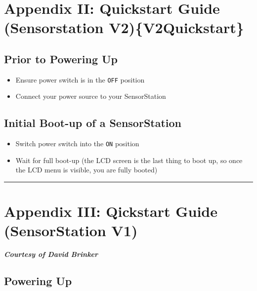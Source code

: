 \documentclass[
]{article}
\providecommand{\tightlist}{%
  \setlength{\itemsep}{0pt}\setlength{\parskip}{0pt}}
\begin{document}
\hypertarget{appendix-ii-quickstart-guide-sensorstation-v2v2quickstart}{%
\section{Appendix II: Quickstart Guide (Sensorstation
V2)\{V2Quickstart\}}\label{appendix-ii-quickstart-guide-sensorstation-v2v2quickstart}}

\hypertarget{prior-to-powering-up}{%
\subsection{Prior to Powering Up}\label{prior-to-powering-up}}

\begin{itemize}
\tightlist
\item
  Ensure power switch is in the \texttt{OFF} position
\item
  Connect your power source to your SensorStation
\end{itemize}

\hypertarget{initial-boot-up-of-a-sensorstation}{%
\subsection{Initial Boot-up of a
SensorStation}\label{initial-boot-up-of-a-sensorstation}}

\begin{itemize}
\tightlist
\item
  Switch power switch into the \texttt{ON} position
\item
  Wait for full boot-up (the LCD screen is the last thing to boot up, so
  once the LCD menu is visible, you are fully booted)
\end{itemize}

\begin{center}\rule{0.5\linewidth}{0.5pt}\end{center}

\hypertarget{V1Quickstart}{%
\section{Appendix III: Qickstart Guide (SensorStation
V1)}\label{V1Quickstart}}

\textbf{\emph{Courtesy of David Brinker}}

\hypertarget{powering-up}{%
\subsection{Powering Up}\label{powering-up}}
\end{document}
